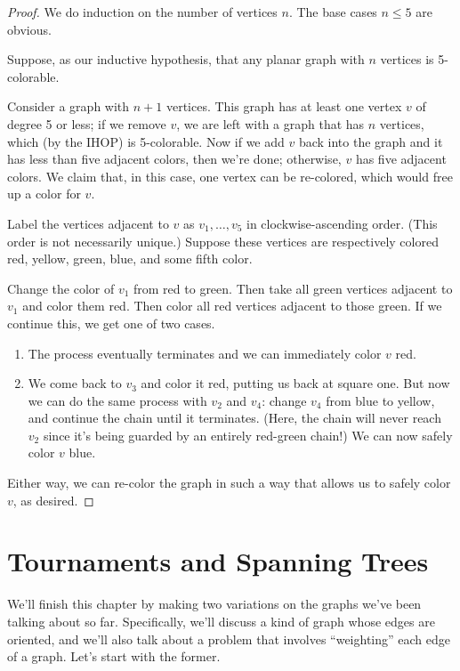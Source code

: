 \documentclass[../m055main.tex]{subfiles}
\begin{document}
\begin{proof}
    We do induction on the number of vertices $n$.
    The base cases $n \leq 5$ are obvious.

    Suppose, as our inductive hypothesis, that any planar graph with $n$ vertices is 5-colorable.

    Consider a graph with $n+1$ vertices.
    This graph has at least one vertex $v$ of degree 5 or less; if we remove $v$, we are left with a graph that has $n$ vertices, which (by the IHOP) is 5-colorable.
    Now if we add $v$ back into the graph and it has less than five adjacent colors, then we're done; otherwise, $v$ has five adjacent colors.
    We claim that, in this case, one vertex can be re-colored, which would free up a color for $v$.

    Label the vertices adjacent to $v$ as $v_1, \ldots, v_5$ in clockwise-ascending order.
    (This order is not necessarily unique.)
    Suppose these vertices are respectively colored red, yellow, green, blue, and some fifth color.

    Change the color of $v_1$ from red to green.
    Then take all green vertices adjacent to $v_1$ and color them red.
    Then color all red vertices adjacent to those green.
    If we continue this, we get one of two cases.
    \begin{enumerate}[label=(\alph*)]
        \item The process eventually terminates and we can immediately color $v$ red.
        \item We come back to $v_3$ and color it red, putting us back at square one.
        But now we can do the same process with $v_2$ and $v_4$: change $v_4$ from blue to yellow, and continue the chain until it terminates.
        (Here, the chain will never reach $v_2$ since it's being guarded by an entirely red-green chain!)
        We can now safely color $v$ blue.
    \end{enumerate}
    Either way, we can re-color the graph in such a way that allows us to safely color $v$, as desired.
\end{proof}

\section{Tournaments and Spanning Trees}
We'll finish this chapter by making two variations on the graphs we've been talking about so far.
Specifically, we'll discuss a kind of graph whose edges are oriented, and we'll also talk about a problem that involves ``weighting'' each edge of a graph.
Let's start with the former.
\end{document}
